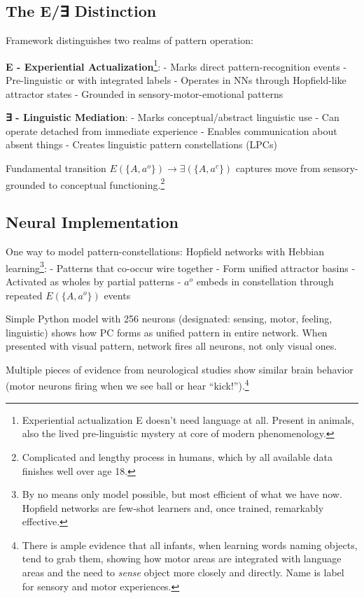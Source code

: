\documentclass[12pt]{article}
\begin{document}
\subsection{The E/∃ Distinction}\label{the-e-distinction}

Framework distinguishes two realms of pattern operation:

\textbf{E - Experiential Actualization}\footnote{Experiential actualization E doesn't need language at all. Present in animals, also the lived pre-linguistic mystery at core of modern phenomenology.}: - Marks direct pattern-recognition events - Pre-linguistic or with integrated labels - Operates in NNs through Hopfield-like attractor states - Grounded in sensory-motor-emotional patterns

\textbf{∃ - Linguistic Mediation}: - Marks conceptual/abstract linguistic use - Can operate detached from immediate experience - Enables communication about absent things - Creates linguistic pattern constellations (LPCs)

Fundamental transition \(E(\{A, a^o\}) \rightarrow \exists(\{A, a^c\})\) captures move from sensory-grounded to conceptual functioning.\footnote{Complicated and lengthy process in humans, which by all available data finishes well over age 18.}

\subsection{Neural Implementation}\label{neural-implementation}

One way to model pattern-constellations: Hopfield networks with Hebbian learning\footnote{By no means only model possible, but most efficient of what we have now. Hopfield networks are few-shot learners and, once trained, remarkably effective.}: - Patterns that co-occur wire together - Form unified attractor basins - Activated as wholes by partial patterns - \(a^o\) embeds in constellation through repeated \(E(\{A, a^o\})\) events

Simple Python model with 256 neurons (designated: sensing, motor, feeling, linguistic) shows how PC forms as unified pattern in entire network. When presented with visual pattern, network fires all neurons, not only visual ones.

Multiple pieces of evidence from neurological studies show similar brain behavior (motor neurons firing when we see ball or hear ``kick!'').\footnote{There is ample evidence that all infants, when learning words naming objects, tend to grab them, showing how motor areas are integrated with language areas and the need to \emph{sense} object more closely and directly. Name is label for sensory and motor experiences.}
\end{document}
